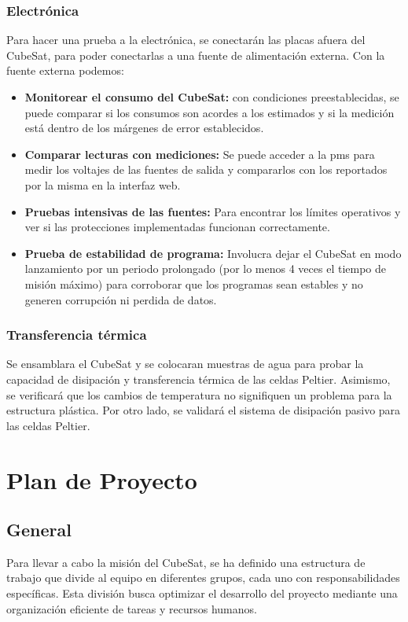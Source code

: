     \subsubsection{Electrónica}
      Para hacer una prueba a la electrónica, se conectarán las placas afuera del CubeSat, para poder conectarlas
      a una fuente de alimentación externa. Con la fuente externa podemos:
      \begin{itemize}
        \item \textbf{Monitorear el consumo del CubeSat:} con condiciones preestablecidas, se puede comparar si los
          consumos son acordes a los estimados y si la medición está dentro de los márgenes de error establecidos.
        \item \textbf{Comparar lecturas con mediciones:} Se puede acceder a la \acrshort{pms} para medir los voltajes de
          las fuentes de salida y compararlos con los reportados por la misma en la interfaz web.
        \item \textbf{Pruebas intensivas de las fuentes:} Para encontrar los límites operativos y ver si las
          protecciones implementadas funcionan correctamente.
        \item \textbf{Prueba de estabilidad de programa:} Involucra dejar el CubeSat en modo lanzamiento por un periodo
          prolongado (por lo menos 4 veces el tiempo de misión máximo) para corroborar que los programas sean estables y
          no generen corrupción ni perdida de datos.
      \end{itemize}

    \subsubsection{Transferencia térmica}
      Se ensamblara el CubeSat y se colocaran muestras de agua para probar la capacidad de disipación y transferencia
      térmica de las celdas Peltier. Asimismo, se verificará que los cambios de temperatura no signifiquen un problema
      para la estructura plástica. Por otro lado, se validará el sistema de disipación pasivo para las celdas Peltier.

\section{Plan de Proyecto}

  \subsection{General}
    Para llevar a cabo la misión del CubeSat, se ha definido una estructura de trabajo que
    divide al equipo en diferentes grupos, cada uno con responsabilidades específicas. Esta división
    busca optimizar el desarrollo del proyecto mediante una organización eficiente de tareas y
    recursos humanos.
